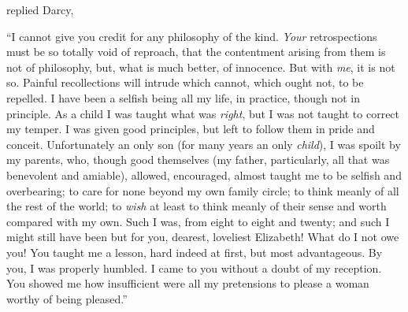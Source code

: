 
 replied Darcy, 


“I cannot give you credit for any philosophy of the kind. {\em Your} retrospections must be so totally void of reproach, that the contentment arising from them is not of philosophy, but, what is much better, of innocence. But with {\em me}, it is not so. Painful recollections will intrude which cannot, which ought not, to be repelled. I have been a selfish being all my life, in practice, though not in principle. As a child I was taught what was {\em right}, but I was not taught to correct my temper. I was given good principles, but left to follow them in pride and conceit. Unfortunately an only son (for many years an only {\em child}), I was spoilt by my parents, who, though good themselves (my father, particularly, all that was benevolent and amiable), allowed, encouraged, almost taught me to be selfish and overbearing; to care for none beyond my own family circle; to think meanly of all the rest of the world; to {\em wish} at least to think meanly of their sense and worth compared with my own. Such I was, from eight to eight and twenty; and such I might still have been but for you, dearest, loveliest Elizabeth! What do I not owe you! You taught me a lesson, hard indeed at first, but most advantageous. By you, I was properly humbled. I came to you without a doubt of my reception. You showed me how insufficient were all my pretensions to please a woman worthy of being pleased.”



